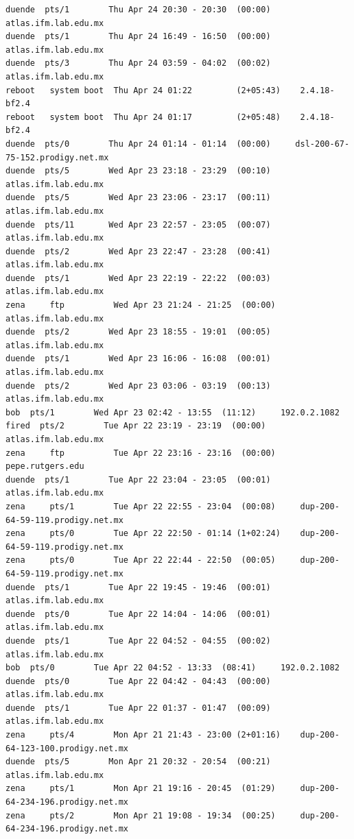\begin{lstlisting}[style=terminal]
duende  pts/1        Thu Apr 24 20:30 - 20:30  (00:00)     atlas.ifm.lab.edu.mx
duende  pts/1        Thu Apr 24 16:49 - 16:50  (00:00)     atlas.ifm.lab.edu.mx
duende  pts/3        Thu Apr 24 03:59 - 04:02  (00:02)     atlas.ifm.lab.edu.mx
reboot   system boot  Thu Apr 24 01:22         (2+05:43)    2.4.18-bf2.4
reboot   system boot  Thu Apr 24 01:17         (2+05:48)    2.4.18-bf2.4
duende  pts/0        Thu Apr 24 01:14 - 01:14  (00:00)     dsl-200-67-75-152.prodigy.net.mx
duende  pts/5        Wed Apr 23 23:18 - 23:29  (00:10)     atlas.ifm.lab.edu.mx
duende  pts/5        Wed Apr 23 23:06 - 23:17  (00:11)     atlas.ifm.lab.edu.mx
duende  pts/11       Wed Apr 23 22:57 - 23:05  (00:07)     atlas.ifm.lab.edu.mx
duende  pts/2        Wed Apr 23 22:47 - 23:28  (00:41)     atlas.ifm.lab.edu.mx
duende  pts/1        Wed Apr 23 22:19 - 22:22  (00:03)     atlas.ifm.lab.edu.mx
zena     ftp          Wed Apr 23 21:24 - 21:25  (00:00)     atlas.ifm.lab.edu.mx
duende  pts/2        Wed Apr 23 18:55 - 19:01  (00:05)     atlas.ifm.lab.edu.mx
duende  pts/1        Wed Apr 23 16:06 - 16:08  (00:01)     atlas.ifm.lab.edu.mx
duende  pts/2        Wed Apr 23 03:06 - 03:19  (00:13)     atlas.ifm.lab.edu.mx
bob  pts/1        Wed Apr 23 02:42 - 13:55  (11:12)     192.0.2.1082
fired  pts/2        Tue Apr 22 23:19 - 23:19  (00:00)     atlas.ifm.lab.edu.mx
zena     ftp          Tue Apr 22 23:16 - 23:16  (00:00)     pepe.rutgers.edu
duende  pts/1        Tue Apr 22 23:04 - 23:05  (00:01)     atlas.ifm.lab.edu.mx
zena     pts/1        Tue Apr 22 22:55 - 23:04  (00:08)     dup-200-64-59-119.prodigy.net.mx
zena     pts/0        Tue Apr 22 22:50 - 01:14 (1+02:24)    dup-200-64-59-119.prodigy.net.mx
zena     pts/0        Tue Apr 22 22:44 - 22:50  (00:05)     dup-200-64-59-119.prodigy.net.mx
duende  pts/1        Tue Apr 22 19:45 - 19:46  (00:01)     atlas.ifm.lab.edu.mx
duende  pts/0        Tue Apr 22 14:04 - 14:06  (00:01)     atlas.ifm.lab.edu.mx
duende  pts/1        Tue Apr 22 04:52 - 04:55  (00:02)     atlas.ifm.lab.edu.mx
bob  pts/0        Tue Apr 22 04:52 - 13:33  (08:41)     192.0.2.1082
duende  pts/0        Tue Apr 22 04:42 - 04:43  (00:00)     atlas.ifm.lab.edu.mx
duende  pts/1        Tue Apr 22 01:37 - 01:47  (00:09)     atlas.ifm.lab.edu.mx
zena     pts/4        Mon Apr 21 21:43 - 23:00 (2+01:16)    dup-200-64-123-100.prodigy.net.mx
duende  pts/5        Mon Apr 21 20:32 - 20:54  (00:21)     atlas.ifm.lab.edu.mx
zena     pts/1        Mon Apr 21 19:16 - 20:45  (01:29)     dup-200-64-234-196.prodigy.net.mx
zena     pts/2        Mon Apr 21 19:08 - 19:34  (00:25)     dup-200-64-234-196.prodigy.net.mx

\end{lstlisting}

